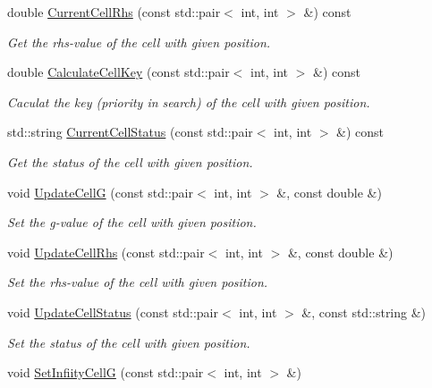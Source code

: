 \begin{DoxyCompactItemize}
double \hyperlink{classMap_aca24bc1a28e9e9d39661a2c1d314c05f}{Current\+Cell\+Rhs} (const std\+::pair$<$ int, int $>$ \&) const 
\begin{DoxyCompactList}\small\item\em Get the rhs-\/value of the cell with given position. \end{DoxyCompactList}\item 
double \hyperlink{classMap_a85598a8b81937ec7c6cee94053a0a6a1}{Calculate\+Cell\+Key} (const std\+::pair$<$ int, int $>$ \&) const 
\begin{DoxyCompactList}\small\item\em Caculat the key (priority in search) of the cell with given position. \end{DoxyCompactList}\item 
std\+::string \hyperlink{classMap_a917164441063705c869d8bcf54424710}{Current\+Cell\+Status} (const std\+::pair$<$ int, int $>$ \&) const 
\begin{DoxyCompactList}\small\item\em Get the status of the cell with given position. \end{DoxyCompactList}\item 
void \hyperlink{classMap_a0a3708f12f41a129ce01de2e1b329b77}{Update\+CellG} (const std\+::pair$<$ int, int $>$ \&, const double \&)
\begin{DoxyCompactList}\small\item\em Set the g-\/value of the cell with given position. \end{DoxyCompactList}\item 
void \hyperlink{classMap_a7d3ff9b29e3de98a9350b3815ae71372}{Update\+Cell\+Rhs} (const std\+::pair$<$ int, int $>$ \&, const double \&)
\begin{DoxyCompactList}\small\item\em Set the rhs-\/value of the cell with given position. \end{DoxyCompactList}\item 
void \hyperlink{classMap_a6744cd1fd471d8c68699fbf919c7d983}{Update\+Cell\+Status} (const std\+::pair$<$ int, int $>$ \&, const std\+::string \&)
\begin{DoxyCompactList}\small\item\em Set the status of the cell with given position. \end{DoxyCompactList}\item 
void \hyperlink{classMap_ab6e992e3c5064f1837fafd3547d9891a}{Set\+Infiity\+CellG} (const std\+::pair$<$ int, int $>$ \&)

\end{DoxyCompactItemize}
